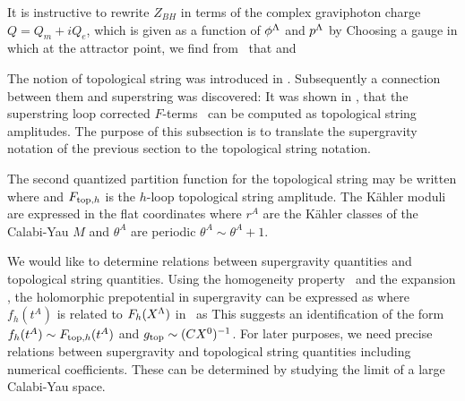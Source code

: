 It is instructive to rewrite $Z_{BH}$ in terms of the complex
graviphoton charge $Q=Q_m+iQ_e$, which is given as a
function of $\phi^{\Lambda}$ and $p^{\Lambda}$ by \eqn{} Choosing a gauge in which \eqn{} at the attractor point, we find
from \ftyv\ that \eqn{} and \eqn{}




The notion of topological string was introduced in
\lref{}
\WittenIG .  Subsequently a connection
between them and superstring was discovered: It was shown
in , that the superstring loop corrected $F$-terms
\dxvl\ can be computed as topological string amplitudes. The
purpose of this subsection is to translate the supergravity
notation of the previous section to the topological string
notation.

The second quantized partition function for the topological
string may be written
%
\eqn{}
 where
\eqn{}
%
and $F_{{\rm top}, h}$ is the $h$-loop topological string
amplitude. The K\"ahler moduli are expressed in the flat
coordinates
%
\eqn{}
%
where $r^A$ are the K\"ahler classes of the Calabi-Yau $M$
and $\theta^A$ are periodic
$\theta^A \sim \theta^A + 1$.

We would like to determine relations between supergravity
quantities and topological string quantities.
Using the homogeneity property \efx\ and the
expansion \dxvl , the holomorphic
prepotential in supergravity can be expressed as
%
\eqn{}
%
where $f_h(t^A)$ is related to
$F_h(X^{\Lambda})$ in \dxvl\ as
%
\eqn{}
%
This suggests an identification of the form $f_h(t^A)
\sim F_{{\rm top}, h}(t^A)$ and $g_{{\rm top}} \sim (CX^0)^{-1}$.
For later purposes, we need precise relations between
supergravity and topological string quantities including
numerical coefficients. These can be determined by studying
the limit of a large Calabi-Yau space.

